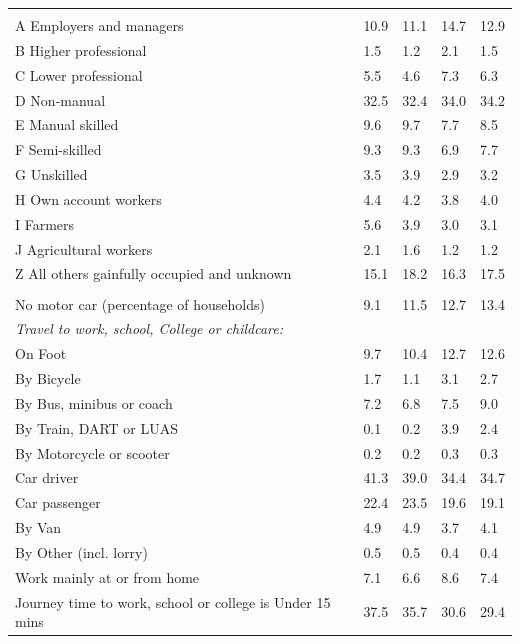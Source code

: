 \documentclass{article}
\begin{document}
\begin{table}[h]
\begin{tabular}{KTTTT}
\hline
    \\ 
    \hline
A Employers and managers & 10.9& 11.1& 14.7& 12.9\\
B Higher professional & 1.5& 1.2& 2.1& 1.5\\
C Lower professional & 5.5& 4.6& 7.3& 6.3\\
D Non-manual & 32.5& 32.4& 34.0& 34.2\\
E Manual skilled & 9.6& 9.7& 7.7& 8.5\\
F Semi-skilled & 9.3& 9.3& 6.9& 7.7\\
G Unskilled & 3.5& 3.9& 2.9& 3.2\\
H Own account workers & 4.4& 4.2& 3.8& 4.0\\
I Farmers & 5.6& 3.9& 3.0& 3.1\\
J Agricultural workers & 2.1& 1.6& 1.2& 1.2\\
Z All others gainfully occupied and unknown & 15.1& 18.2& 16.3& 17.5\\
\hline
{}\hline
    \\ 
    \hline
No motor car (percentage of households) &  9.1& 11.5& 12.7& 
13.4\\
    \hline 
\emph{Travel to work, school, College or childcare:} & & & \\
\quad On Foot &  9.7& 10.4& 12.7& 12.6\\ 
\quad By Bicycle & 1.7& 1.1& 3.1& 2.7\\ 
\quad By Bus, minibus or coach & 7.2& 6.8& 7.5& 9.0\\
\quad By Train, DART or LUAS & 0.1& 0.2& 3.9& 2.4\\
\quad By Motorcycle or scooter & 0.2& 0.2& 0.3& 0.3\\
\quad Car driver & 41.3 & 39.0& 34.4& 34.7\\
\quad Car passenger & 22.4& 23.5& 19.6& 19.1\\
\quad By Van & 4.9& 4.9& 3.7& 4.1\\
\quad By Other (incl. lorry) & 0.5& 0.5& 0.4& 0.4\\
    \hline
Work mainly at or from home & 7.1& 6.6& 8.6& 7.4\\
Journey time to work, school or college is Under 15 mins & 37.5& 35.7& 30.6& 29.4\\

\end{tabular}
\end{table}
\end{document}
